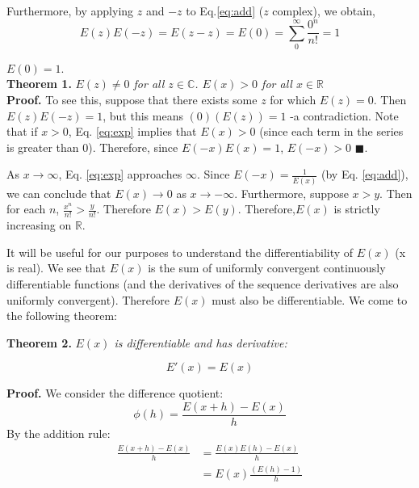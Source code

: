 \documentclass{article}
\begin{document}
Furthermore, by applying $z$ and $-z$ to  Eq.\ref{eq:add} ($z$ complex), we obtain, 
$$E(z)E(-z)=E(z-z)=E(0)=\sum_0^\infty \frac{0^n}{n!} = 1$$

 $E(0)=1$.  \\


\noindent \textbf{Theorem 1.}  \emph{$E(z) \neq 0$ for all $z\in \mathbb{C}$.  $E(x)>0$ for all $x\in \mathbb{R}$}\\

\noindent \textbf{Proof.}  To see this, suppose that there exists some $z$ for which $ E(z)=0$.  Then $E(z)E(-z)=1$, but this means $(0)(E(z))=1$ -a contradiction.
Note that if $x>0$, Eq. \ref{eq:exp}  implies that $E(x)>0$ (since each term in the series is greater than 0).  Therefore, since $ E(-x)E(x)=1$, $E(-x)>0$ $\blacksquare$.

As $x\rightarrow \infty$, Eq. \ref{eq:exp} approaches $\infty$.  Since $E(-x)=\frac{1}{E(x)}$ (by Eq. \ref{eq:add}), we can conclude that $E(x) \rightarrow 0$ as $x\rightarrow -\infty$.  Furthermore, suppose $x>y$.  Then for each $n$, $\frac{x^n}{n!}>\frac{y}{n!}$.  Therefore $E(x)>E(y)$.  Therefore,$ E(x)$ is strictly increasing on $\mathbb{R}$.  

It will be useful for our purposes to understand the differentiability of $E(x)$ (x is real).  We see that $E(x)$ is the sum of uniformly convergent continuously differentiable functions (and the derivatives of the sequence  derivatives are also uniformly convergent).  Therefore $E(x)$ must also be differentiable.  We come to the following theorem:

\newpage
\noindent  \textbf{Theorem 2.} \emph{$E(x)$ is differentiable and has derivative:}

\begin{equation}
\label{eq:DE}
E'(x)=E(x) 
\end{equation}



\noindent \textbf{Proof.} We consider the difference quotient: 
\begin{equation}
\label{eq:DE}
\phi(h) = \frac{E(x+h)-E(x)}{h}
\end{equation}
By the addition rule:
\begin{align}
\label{eq:DE}
 \frac{E(x+h)-E(x)}{h} &= \frac{E(x)E(h)-E(x)}{h}\\
\label{eq:hi}
&= E(x)\frac{(E(h)-1)}{h}
\end{align}
\end{document}
